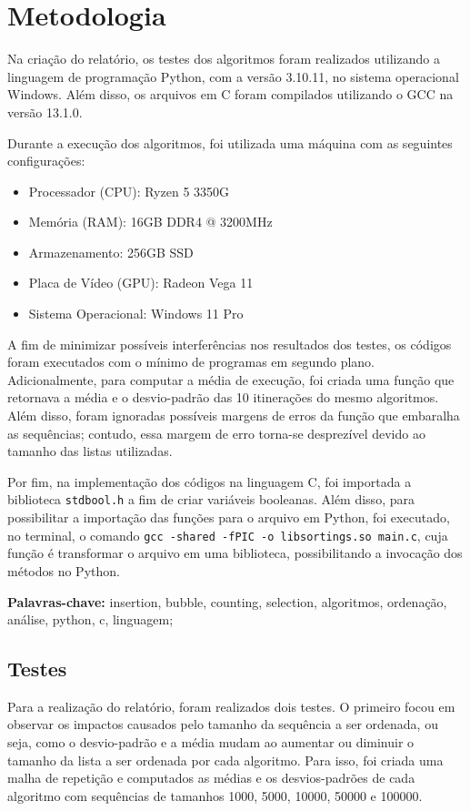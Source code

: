 \documentclass[10pt,a4paper]{article}
\newcommand{\code}[1]{\colorbox{light-gray}{\lstinline{#1}}}
\begin{document}
\section*{Metodologia}
Na criação do relatório, os testes dos algoritmos foram realizados utilizando a linguagem de programação Python, com a versão 3.10.11, no sistema operacional Windows.
Além disso, os arquivos em C foram compilados utilizando o GCC na versão 13.1.0.

Durante a execução dos algoritmos, foi utilizada uma máquina com as seguintes configurações:

\begin{itemize}
\item    Processador (CPU): Ryzen 5 3350G 
\item Memória (RAM): 16GB DDR4 @ 3200MHz
\item Armazenamento: 256GB SSD
\item Placa de Vídeo (GPU): Radeon Vega 11
\item Sistema Operacional: Windows 11 Pro
\end{itemize}
A fim de minimizar possíveis interferências nos resultados dos testes, os códigos foram executados com o mínimo de programas em segundo plano. 
Adicionalmente, para computar a média de execução, foi criada uma função que retornava a média e o desvio-padrão das 10 itinerações do mesmo algoritmos.
Além disso, foram ignoradas possíveis margens de erros da função que embaralha as sequências; contudo, essa margem de erro torna-se desprezível devido ao tamanho das listas utilizadas.

Por fim, na implementação dos códigos na linguagem C, foi importada a biblioteca \code{stdbool.h} a fim de criar variáveis booleanas. Além disso, para possibilitar a importação das funções para o arquivo em Python, foi executado, no terminal, o comando \code{gcc -shared -fPIC -o libsortings.so main.c}, cuja função é transformar o arquivo em uma biblioteca, possibilitando a invocação dos métodos no Python.

\noindent\textbf{Palavras-chave:} insertion, bubble, counting, selection, algoritmos, ordenação, análise, python, c, linguagem;

\subsection*{Testes}
    Para a realização do relatório, foram realizados dois testes. 
    O primeiro focou em observar os impactos causados pelo tamanho da sequência a ser ordenada, ou seja, como o desvio-padrão e a média mudam ao aumentar ou diminuir o tamanho da lista a ser ordenada por cada algoritmo. 
    Para isso, foi criada uma malha de repetição e computados as médias e os desvios-padrões de cada algoritmo com sequências de tamanhos 1000, 5000, 10000, 50000 e 100000.
    
\end{document}
